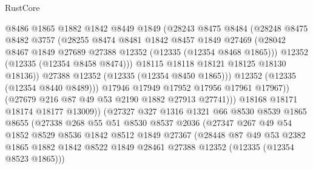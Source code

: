 \begin{lexlean}{RustCore}
\begin{coremodule}
                        @8486
                        @1865
                        @1882
                        @1842
                        @8449
                        @1849
                        (@28243
                          @8475
                          @8484
                          (@28248
                            @8475
                            @8482
                            @3757
                            (@28255
                              @8474
                              @8481
                              @1842
                              @8457
                              @1849
                              @27469
                              (@28042
                                @8467
                                @1849
                                @27689
                                @27388
                                @12352
                                (@12335 (@12354 @8468 @1865)))
                              @12352
                              (@12335 (@12354 @8458 @8474)))
                            @18115
                            @18118
                            @18121
                            @18125
                            @18130
                            @18136))
                        @27388
                        @12352
                        (@12335 (@12354 @8450 @1865)))
                      @12352
                      (@12335 (@12354 @8440 @8489)))
                    @17946
                    @17949
                    @17952
                    @17956
                    @17961
                    @17967))
                (@27679 @216 @87 @49 @53 @2190 @1882 @27913 @27741)))
            @18168
            @18171
            @18174
            @18177
            @13009))
        (@27327
          @327
          @1316
          @1321
          @66
          @8530
          @8539
          @1865
          @8655
          (@27338
            @268
            @55
            @51
            @8530
            @8537
            @2036
            (@27347
              @267
              @49
              @54
              @1852
              @8529
              @8536
              @1842
              @8512
              @1849
              @27367
              (@28448
                @87
                @49
                @53
                @2382
                @1865
                @1882
                @1842
                @8522
                @1849
                @28461
                @27388
                @12352
                (@12335 (@12354 @8523 @1865)))

\end{coremodule}
\end{lexlean}
